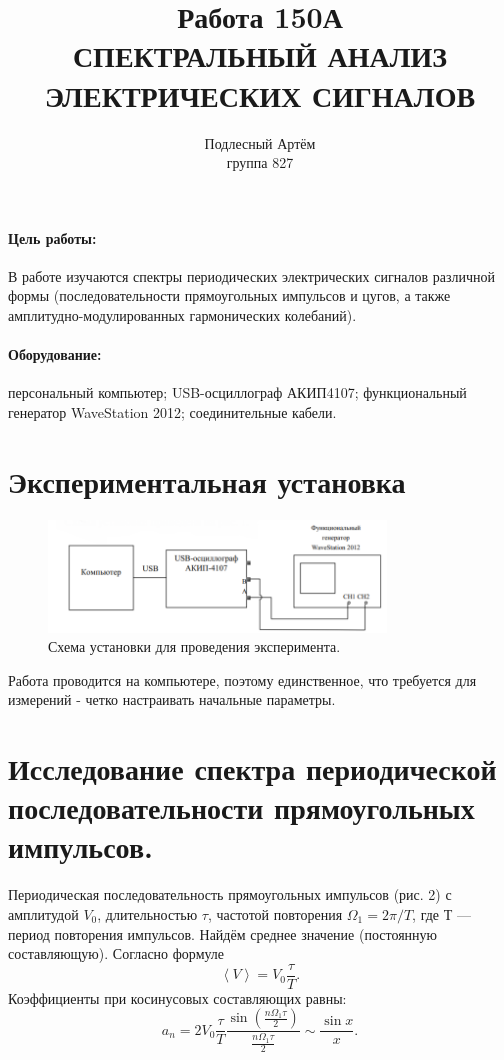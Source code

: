 \documentclass[a4paper, 14pt]{extarticle}%
\author{Подлесный Артём \\ группа 827}
\title{Работа 150А \\ СПЕКТРАЛЬНЫЙ АНАЛИЗ ЭЛЕКТРИЧЕСКИХ СИГНАЛОВ}
\newcommand\ECaption[1]{%
     \captionsetup{font=footnotesize}%
     \caption{#1}}
\begin{document}
\maketitle
\paragraph*{Цель работы:}
В работе изучаются спектры периодических электрических сигналов
различной формы (последовательности прямоугольных импульсов и цугов,
а также амплитудно-модулированных гармонических колебаний). 
\paragraph*{Оборудование:} персональный компьютер; USB-осциллограф АКИП4107; функциональный генератор WaveStation 2012; соединительные кабели.
\section*{Экспериментальная установка}
\begin{figure}[h!]
\begin{center}
\includegraphics[width=0.8\textwidth]{ust}
\end{center}
\ECaption{Схема установки для проведения эксперимента.}
\end{figure}

Работа проводится на компьютере, поэтому единственное, что требуется для измерений - четко настраивать начальные параметры.

\section*{Исследование спектра периодической последовательности
прямоугольных импульсов.}

 Периодическая последовательность прямоугольных импульсов (рис. 2) с амплитудой $V_0$, длительностью $\tau$, частотой повторения $\Omega_1=2\pi/T$, где $Т$ — период повторения импульсов.
Найдём среднее значение (постоянную составляющую). Согласно формуле 
\[\left\langle V \right\rangle  = V_0\frac{\tau}{T}.\]
Коэффициенты при косинусовых составляющих равны:
\[a_n = 2V_0\frac{\tau}{T}\frac{\sin\left( \frac{n\Omega_1\tau}{2}\right) }{\frac{n\Omega_1\tau}{2}} \sim \frac{\sin x}{x}.\]
\end{document}
